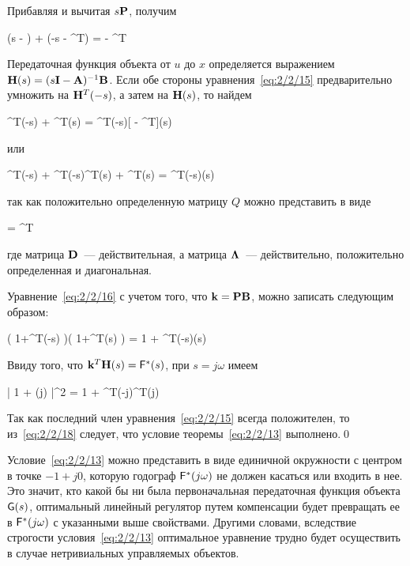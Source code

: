 Прибавляя и вычитая $s\mathbf{P}$, получим

    (s - ) + (-s - ^T) =  - ^T 
\eeq

Передаточная функция объекта от $u$ до $x$ определяется выражением $\mathbf{H}(s) = (s\mathbf{I}-\mathbf{A})^{-1}\mathbf{B}$. Если обе стороны уравнения~\vref{eq:2/2/15} предварительно умножить на $\mathbf{H}^T(-s)$, а затем на $\mathbf{H}(s)$, то найдем

\beqn
    ^T(-s)  + ^T(s) = ^T(-s)[ - ^T](s)
\eeqn

или

    ^T(-s) + ^T(-s)^T(s) + ^T(s) = ^T(-s)(s) \text{,}
\eeq

так как положительно определенную матрицу $Q$ можно представить в виде\cite{BELLMAN2}

\beqn
     = ^T\m{\Lambda} \text{,}
\eeqn

где матрица $\mathbf{D}$~--- действительная, а матрица $\mathbf{\Lambda}$~--- действительно, положительно определенная и диагональная.

Уравнение~\ref{eq:2/2/16} с учетом того, что $\mathbf{k} = \mathbf{P}\mathbf{B}$, можно записать следующим образом:

    \bigl( 1+^T(-s) \bigr)\bigl( 1+^T(s) \bigr) = 1 + ^T(-s)\m{\Lambda}(s) 
\eeq

Ввиду того, что $\mathbf{k}^T\mathbf{H}(s) = \mathsf{F}^{*}(s)$, при $s = j\omega$ имеем

    \bigl| 1 + \funcT(j\omega) \bigr|^2 = 1 + ^T(-j\omega)^T\m{\Lambda}(j\omega) 
\eeq

Так как последний член уравнения~\vref{eq:2/2/15} всегда положителен, то из~\ref{eq:2/2/18} следует, что условие теоремы~\ref{eq:2/2/13} выполнено.\qed

Условие~\ref{eq:2/2/13} можно представить в виде единичной окружности с центром в точке $-1 + j0$, которую годограф $\mathsf{F}^{*}(j\omega)$ не должен касаться или входить в нее. Это значит, кто какой бы ни была первоначальная передаточная функция объекта $\mathsf{G}(s)$, оптимальный линейный регулятор путем компенсации будет превращать ее в $\mathsf{F}^{*}(j\omega)$ с указанными выше свойствами. Другими словами, вследствие строгости условия~\vref{eq:2/2/13} оптимальное уравнение трудно будет осуществить в случае нетривиальных управляемых объектов.

